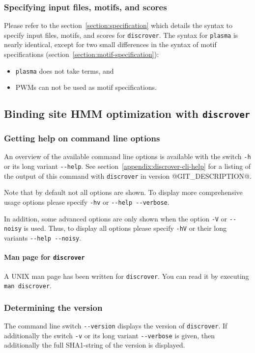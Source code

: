 \documentclass[a4paper]{article}
\makeatletter
\newcommand{\plasma}[0]{\texttt{plasma}}
\newcommand{\discrover}[0]{\texttt{discrover}}
\newcommand{\version}[0]{@GIT_DESCRIPTION@}
\makeatother
\begin{document}
\subsubsection{Specifying input files, motifs, and scores}
Please refer to the section~\ref{section:specification} which details the syntax to specify input files, motifs, and scores for \discrover{}.
The syntax for \plasma{} is nearly identical, except for two small differences in the syntax of motif specifications (section~\ref{section:motif-specification}):
\begin{itemize}
  \item
    \plasma{} does not take  terms, and
  \item
    PWMs can not be used as motif specifications.
\end{itemize}


\subsection{Binding site HMM optimization with \discrover{}}
\label{subsection:running-discrover}
\subsubsection{Getting help on command line options}
An overview of the available command line options is available with the switch \verb|-h| or its long variant \verb|--help|.
See section~\ref{appendix:discrover-cli-help} for a listing of the output of this command with \discrover{} in version \version{}.

Note that by default not all options are shown.
To display more comprehensive usage options please specify \verb|-hv| or \verb|--help --verbose|.

In addition, some advanced options are only shown when the option \verb|-V| or \verb|--noisy| is used.
Thus, to display all options please specify \verb|-hV| or their long variants \verb|--help --noisy|.

\paragraph{Man page for \discrover{}}
A UNIX man page has been written for \discrover{}.
You can read it by executing \verb|man discrover|.

\subsubsection{Determining the version}
The command line switch \verb|--version| displays the version of \discrover{}.
If additionally the switch \verb|-v| or its long variant \verb|--verbose| is given, then additionally the full SHA1-string of the version is displayed.
\end{document}

